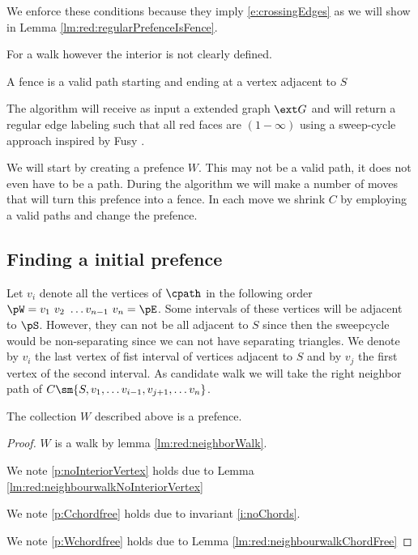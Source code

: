   We enforce these conditions because they imply \ref{e:crossingEdges} as we will show in Lemma \ref{lm:red:regularPrefenceIsFence}.

  For a walk however the interior is not clearly defined. 

  \begin{defi}[Fence]
    A fence is a valid path starting and ending at a vertex adjacent to $S$
  \end{defi}




  The algorithm will receive as input a extended graph $\ext G$ and will return a regular edge labeling such that all red faces are $(1-\infty)$ using a sweep-cycle approach inspired by Fusy \cite{Fusy2006}.

  We will start by creating a prefence $W$. This may not be a valid path, it does not even have to be a path. During the algorithm we will make a number of moves that will turn this prefence into a fence. In each move we shrink $C$ by employing a valid paths and change the prefence.

\subsection{Finding a initial prefence}
  Let $v_i$ denote all the vertices of $\cpath$ in the following order $\pW =  v_1 \  v_2 \  \ldots v_{n-1} \  v_n = \pE$.
  Some intervals of these vertices will be adjacent to $\pS$. However, they can not be all adjacent to $S$ since then the sweepcycle would be non-separating since we can not have separating triangles. We denote by $v_i$ the last vertex of fist interval of vertices adjacent to $S$ and by $v_j$ the first vertex of the second interval.
  As candidate walk we will take the right neighbor path of $C\sm{S, v_1, \ldots v_{i-1}, v_{j+1}, \dots v_n}$.

  \begin{lemma}
    \label{lm:red:isPrefence}
  The collection $W$ described above is a prefence.
  \end{lemma}
  \begin{proof}
  $W$ is a walk by lemma \ref{lm:red:neighborWalk}.

  We note \ref{p:noInteriorVertex} holds due to Lemma \ref{lm:red:neighbourwalkNoInteriorVertex}

  We note \ref{p:Cchordfree} holds due to invariant \ref{i:noChords}.

  We note \ref{p:Wchordfree} holds due to Lemma \ref{lm:red:neighbourwalkChordFree}

  \end{proof}

